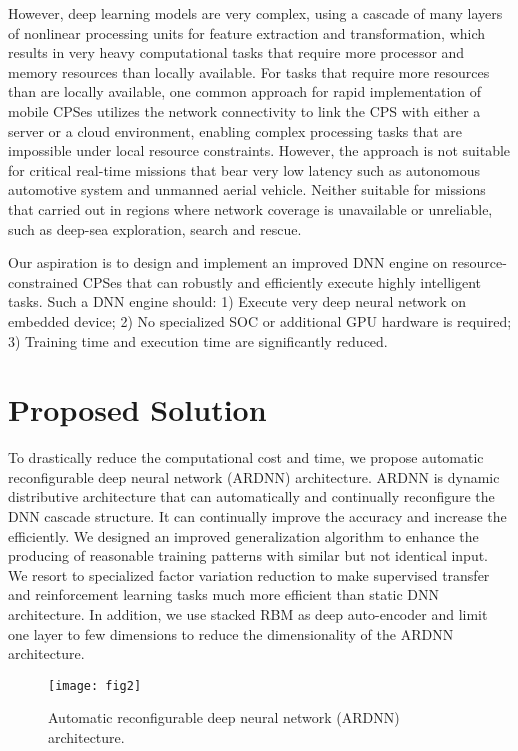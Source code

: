 However, deep learning models are very complex, using a cascade of many layers of nonlinear processing units for feature extraction and transformation,
which results in very heavy computational tasks that require more processor and memory resources than locally available.
For tasks that require more resources than are locally available,
one common approach for rapid implementation of mobile CPSes utilizes the network connectivity to link the CPS with either a server or a cloud environment,
enabling complex processing tasks that are impossible under local resource constraints.
However, the approach is not suitable for critical real-time missions that bear very low latency such as autonomous automotive system and unmanned aerial vehicle.
Neither suitable for missions that carried out in regions where network coverage is unavailable or unreliable, such as deep-sea exploration, search and rescue. 

Our aspiration is to design and implement an improved DNN engine on resource-constrained CPSes that can robustly and efficiently execute highly intelligent tasks.
Such a DNN engine should: 1) Execute very deep neural network on embedded device; 2) No specialized SOC or additional GPU hardware is required;
3) Training time and execution time are significantly reduced.


\section{Proposed Solution}

To drastically reduce the computational cost and time, we propose automatic reconfigurable deep neural network (ARDNN) architecture.
ARDNN is dynamic distributive architecture that can automatically and continually reconfigure the DNN cascade structure.
It can continually improve the accuracy and increase the efficiently.
We designed an improved generalization algorithm to enhance the producing of reasonable training patterns with similar but not identical input.
We resort to specialized factor variation reduction to make supervised transfer and reinforcement learning tasks much more efficient than static DNN architecture.
In addition, we use stacked RBM as deep auto-encoder and limit one layer to few dimensions to reduce the dimensionality of the ARDNN architecture. 

\begin{figure}[htbp]
	\centering
    \texttt{[image: fig2]}
	\caption{Automatic reconfigurable deep neural network (ARDNN) architecture.}
	\label{fig:fig2}
\end{figure}


